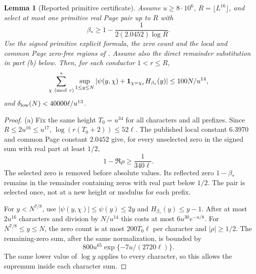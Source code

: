 \documentclass[11pt,a4paper]{article}
\newtheorem{lemma}[theorem]{Lemma}
\theoremstyle{definition}
\theoremstyle{remark}
\begin{document}
\begin{lemma}[Reported primitive certificate]\label{lem:ext-primitive}
Assume $u\geq8\cdot10^6$, $R=\lfloor L^{16}\rfloor$, and select
at most one primitive real Page pair up to $R$ with
\[
 \beta_*\geq1-\frac1{2(2.0452)\log R}.
\]
Use the signed primitive explicit formula, the zero count and the
local and common Page zero-free regions of \cite{Bordignon}.
Assume also the direct remainder substitution in part (b) below.
Then, for each conductor $1<r\leq R$,
\[
 \sum_{\chi\ ({\rm mod}\ r)}^*
 \sup_{1\leq y\leq N}
 |\psi(y,\chi)+\mathbf1_{\chi=\chi_*}H_{\beta_*}(y)|
 \leq100N/u^{14},
\]
and $\delta_{\rm low}(N)<40000\ell/u^{13}$.
\end{lemma}

\begin{proof}
(a) Fix the same height $T_0=u^{34}$ for all characters and all
prefixes. Since $R\leq2u^{16}\leq u^{17}$,
$\log(r(T_0+2))\leq52\ell$. The published local constant
$6.3970$ and common Page constant $2.0452$ give, for every unselected
zero in the signed sum with real part at least $1/2$,
\[
 1-\Re\rho\geq\frac1{340\ell}.
\]
The selected zero is removed before absolute values. Its reflected
zero $1-\beta_*$ remains in the remainder containing zeros with real part below $1/2$. The pair
is selected once, not at a new height or modulus for each prefix.

For $y<N^{7/8}$, use $|\psi(y,\chi)|\leq\psi(y)\leq2y$ and
$H_{\beta_*}(y)\leq y-1$. After at most $2u^{16}$ characters and
division by $N/u^{14}$ this costs at most
$6u^{30}e^{-u/8}$.
For $N^{7/8}\leq y\leq N$, the zero count is at most
$200T_0\ell$ per character and $|\rho|\geq1/2$. The remaining-zero
sum, after the same normalization, is bounded by
\begin{equation}\label{eq:ext-zero-fee}
 800u^{65}\exp\{-7u/(2720\ell)\}.
\end{equation}
The same lower value of $\log y$ applies to every character, so this
allows the supremum inside each character sum.


\end{proof}
\end{document}

